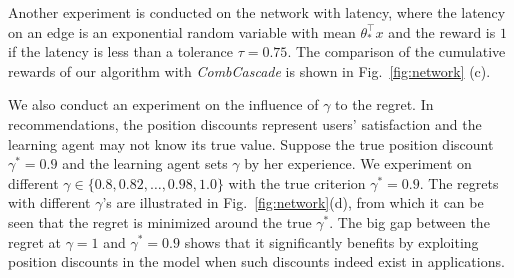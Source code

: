 \documentclass{article}
\begin{document}
Another experiment is conducted on the network with latency, where the latency on an edge is an exponential random variable with mean $\theta_{\ast}^{\top}x$ and the reward is $1$ if the latency is less than a tolerance $\tau = 0.75$. The comparison of the cumulative rewards of our algorithm with {\it CombCascade} is shown in Fig.~\ref{fig:network} (c).

We also conduct an experiment on the influence of $\gamma$ to the regret. In recommendations, the position discounts represent users' satisfaction and the learning agent may not know its true value. Suppose the true position discount $\gamma^{\ast} = 0.9$ and the learning agent sets $\gamma$ by her experience. We experiment on different $\gamma \in \{0.8, 0.82, \ldots, 0.98, 1.0\}$ with the true criterion $\gamma^{\ast} = 0.9$. The regrets with different $\gamma$'s are illustrated in Fig.~\ref{fig:network}(d), from which it can be seen that the regret is minimized around the true $\gamma^{\ast}$. The big gap between the regret at $\gamma = 1$ and $\gamma^{\ast} = 0.9$ shows that it significantly benefits by exploiting position discounts in the model when such discounts indeed exist in applications.
\end{document}

